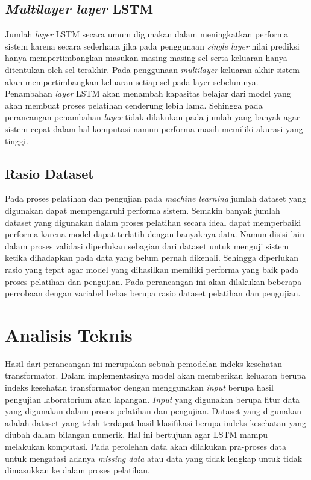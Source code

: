 \subsection{\textit{Multilayer layer} LSTM}
Jumlah \textit{layer} LSTM secara umum digunakan dalam meningkatkan performa sistem karena secara sederhana jika pada penggunaan \textit{single layer} nilai prediksi hanya mempertimbangkan masukan masing-masing sel serta keluaran hanya ditentukan oleh sel terakhir. Pada penggunaan \textit{multilayer} keluaran akhir sistem akan mempertimbangkan keluaran setiap sel pada layer sebelumnya. Penambahan \textit{layer} LSTM akan menambah kapasitas belajar dari model yang akan membuat proses pelatihan cenderung lebih lama. Sehingga pada perancangan penambahan \textit{layer} tidak dilakukan pada jumlah yang banyak agar sistem cepat dalam hal komputasi namun performa masih memiliki akurasi yang tinggi. 

\subsection{Rasio Dataset}
Pada proses pelatihan dan pengujian pada \textit{machine learning} jumlah dataset yang digunakan dapat mempengaruhi performa sistem. Semakin banyak jumlah dataset yang digunakan dalam proses pelatihan secara ideal dapat memperbaiki performa karena model dapat terlatih dengan banyaknya data. Namun disisi lain dalam proses validasi diperlukan sebagian dari dataset untuk menguji sistem ketika dihadapkan pada data yang belum pernah dikenali. Sehingga diperlukan rasio yang tepat agar model yang dihasilkan memiliki performa yang baik pada proses pelatihan dan pengujian. Pada perancangan ini akan dilakukan beberapa percobaan dengan variabel bebas berupa rasio dataset pelatihan dan pengujian.

\section{Analisis Teknis}

Hasil dari perancangan ini merupakan sebuah pemodelan indeks kesehatan transformator. Dalam implementasinya model akan memberikan keluaran berupa indeks kesehatan transformator dengan menggunakan \textit{input} berupa hasil pengujian laboratorium atau lapangan. \textit{Input} yang digunakan berupa fitur data yang digunakan dalam proses pelatihan dan pengujian. Dataset yang digunakan adalah dataset yang telah terdapat hasil klasifikasi berupa indeks kesehatan yang diubah dalam bilangan numerik. Hal ini bertujuan agar LSTM mampu melakukan komputasi. Pada perolehan data akan dilakukan pra-proses data untuk mengatasi adanya \textit{missing data} atau data yang tidak lengkap untuk tidak dimasukkan ke dalam proses pelatihan.

